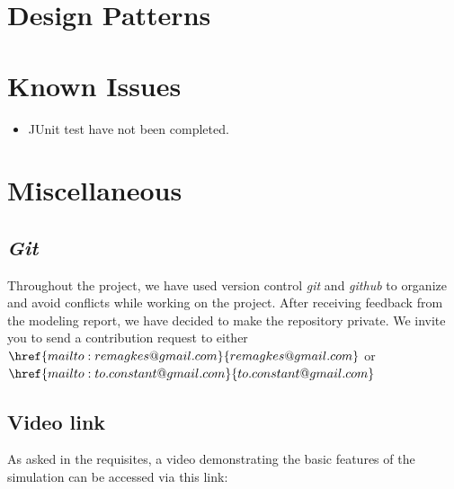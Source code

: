 \documentclass[11pt]{article}
\begin{document}
\section{Design Patterns}
\section{Known Issues}
\begin{itemize}
\item JUnit test have not been completed.
\end{itemize}
\section{Miscellaneous}
\subsection{\textit{Git}}
Throughout the project, we have used version control \textit{git} and \textit{github} to organize and avoid conflicts while working on the project. After receiving feedback from the modeling report, we have decided to make the repository private. We invite you to send a contribution request to either $\href{mailto:remagkes@gmail.com}{remagkes@gmail.com} $ or $\href{mailto:to.constant@gmail.com}{to.constant@gmail.com}$
\subsection{Video link}
As asked in the requisites, a video demonstrating the basic features of the simulation can be accessed via this link: 
\end{document}
